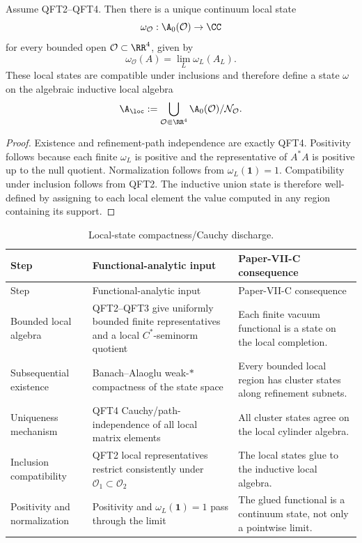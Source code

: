 \documentclass[12pt,a4paper]{article}
\begin{document}
\begin{theorem}
\label{p12:thm:canonical-local-state}
Assume QFT2--QFT4.  Then there is a unique continuum local state
\[
\omega_{\mathcal O}:\A_0(\mathcal O)\to\CC
\]
for every bounded open \(\mathcal O\subset\RR^4\), given by
\begin{equation}
\label{p12:eq:omega-local-limit}
\omega_{\mathcal O}(A)=\lim_{L}\omega_L(A_L).
\end{equation}
These local states are compatible under inclusions and therefore define a state \(\omega\) on the algebraic inductive local algebra
\[
\A_{\loc}:=\bigcup_{\mathcal O\Subset\RR^4}\A_0(\mathcal O)/\mathcal N_{\mathcal O}.
\]
\end{theorem}
\begin{proof}
Existence and refinement-path independence are exactly QFT4.  Positivity follows because each finite \(\omega_L\) is positive and the representative of \(A^*A\) is positive up to the null quotient.  Normalization follows from \(\omega_L(\mathbf1)=1\).  Compatibility under inclusion follows from QFT2.  The inductive union state is therefore well-defined by assigning to each local element the value computed in any region containing its support.
\end{proof}



\begin{longtable}{>{\raggedright\arraybackslash}p{} >{\raggedright\arraybackslash}p{} >{\raggedright\arraybackslash}p{}}
\caption[Local-state compactness/Cauchy discharge]{Local-state compactness/Cauchy discharge.}\label{p12:tab:local-state-compactness-cauchy-discharge}\\
\toprule
Step & Functional-analytic input & Paper-VII-C consequence \\
\midrule
\endfirsthead
\toprule
Step & Functional-analytic input & Paper-VII-C consequence \\
\midrule
\endhead
Bounded local algebra & QFT2--QFT3 give uniformly bounded finite representatives and a local \(C^*\)-seminorm quotient & Each finite vacuum functional is a state on the local completion. \\
Subsequential existence & Banach--Alaoglu weak-\(*\) compactness of the state space & Every bounded local region has cluster states along refinement subnets. \\
Uniqueness mechanism & QFT4 Cauchy/path-independence of all local matrix elements & All cluster states agree on the local cylinder algebra. \\
Inclusion compatibility & QFT2 local representatives restrict consistently under \(\mathcal O_1\subset\mathcal O_2\) & The local states glue to the inductive local algebra. \\
Positivity and normalization & Positivity and \(\omega_L(\mathbf1)=1\) pass through the limit & The glued functional is a continuum state, not only a pointwise limit. \\
\bottomrule
\end{longtable}
\end{document}
